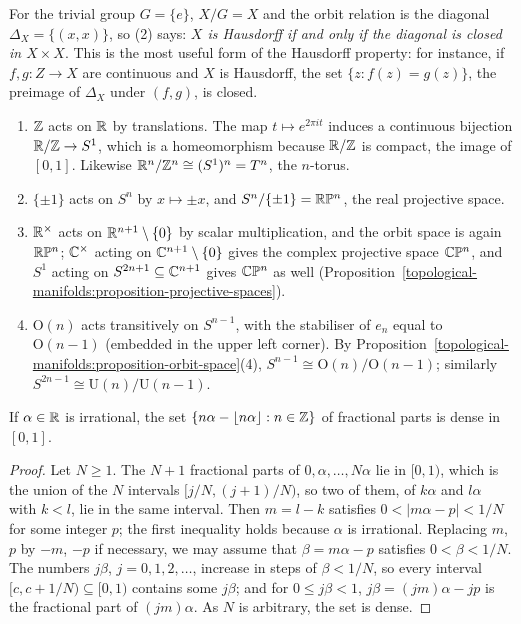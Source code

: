 For the trivial group $G = \{e\}$, $X/G = X$ and the orbit relation is the diagonal $\Delta_X = \{(x, x)\}$, so (2) says: \emph{$X$ is Hausdorff if and only if the diagonal is closed in
$X \times X$}. This is the most useful form of the Hausdorff property: for instance, if $f, g \colon Z \to X$ are continuous and $X$ is Hausdorff, the set $\{z : f(z) = g(z)\}$, the preimage of
$\Delta_X$ under $(f, g)$, is closed.

\begin{example}\label{topological-manifolds:example-orbit-spaces}
\begin{enumerate}
\item $\mathbb{Z}$ acts on $\mathbb{R}$ by translations. The map $t \mapsto e^{2\pi it}$ induces a continuous bijection $\mathbb{R}/\mathbb{Z} \to S^1$, which is a homeomorphism because $\mathbb{R}/\mathbb{Z}$ is compact, the image of $[0, 1]$. Likewise
$\mathbb{R}^n/\mathbb{Z}^n \cong (S^1)^n = T^n$, the $n$-torus.
\item $\{\pm1\}$ acts on $S^n$ by $x \mapsto \pm x$, and $S^n/\{\pm1\} = \mathbb{R}\mathbb{P}^n$, the real projective space.
\item $\mathbb{R}^\times$ acts on $\mathbb{R}^{n+1} \setminus \{0\}$ by scalar multiplication, and the orbit space is again $\mathbb{R}\mathbb{P}^n$; $\mathbb{C}^\times$ acting on $\mathbb{C}^{n+1} \setminus \{0\}$ gives the complex projective space $\mathbb{C}\mathbb{P}^n$, and $S^1$
acting on $S^{2n+1} \subseteq \mathbb{C}^{n+1}$ gives $\mathbb{C}\mathbb{P}^n$ as well (Proposition~\ref{topological-manifolds:proposition-projective-spaces}).
\item $\mathrm{O}(n)$ acts transitively on $S^{n-1}$, with the stabiliser of $e_n$ equal to $\mathrm{O}(n - 1)$ (embedded in the upper left corner). By Proposition~\ref{topological-manifolds:proposition-orbit-space}(4),
$S^{n-1} \cong \mathrm{O}(n)/\mathrm{O}(n - 1)$; similarly $S^{2n-1} \cong \mathrm{U}(n)/\mathrm{U}(n - 1)$.
\end{enumerate}
\end{example}

\begin{lemma}[Kronecker]\label{topological-manifolds:lemma-kronecker}
If $\alpha \in \mathbb{R}$ is irrational, the set $\{n\alpha - \lfloor n\alpha\rfloor : n \in \mathbb{Z}\}$ of fractional parts is dense in $[0, 1]$.
\end{lemma}

\begin{proof}
Let $N \geq 1$. The $N + 1$ fractional parts of $0, \alpha, \ldots, N\alpha$ lie in $[0, 1)$, which is the union of the $N$ intervals $[j/N, (j+1)/N)$, so two of them, of $k\alpha$ and $l\alpha$ with $k < l$, lie in the same
interval. Then $m = l - k$ satisfies $0 < |m\alpha - p| < 1/N$ for some integer $p$; the first inequality holds because $\alpha$ is irrational. Replacing $m$, $p$ by $-m$, $-p$ if necessary, we may assume that
$\beta = m\alpha - p$ satisfies $0 < \beta < 1/N$. The numbers $j\beta$, $j = 0, 1, 2, \ldots$, increase in steps of $\beta < 1/N$, so every interval $[c, c + 1/N) \subseteq [0, 1)$ contains some $j\beta$; and for $0 \leq j\beta < 1$,
$j\beta = (jm)\alpha - jp$ is the fractional part of $(jm)\alpha$. As $N$ is arbitrary, the set is dense.
\end{proof}

